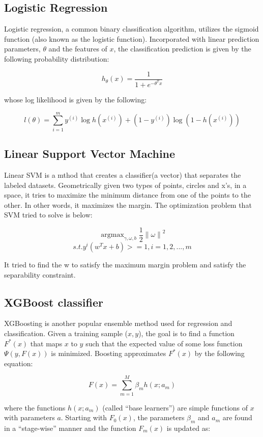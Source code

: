\documentclass[10pt]{article}
\DeclareMathOperator*{\argmax}{argmax}
\begin{document}
\subsection{Logistic Regression}
Logistic regression, a common binary classification algorithm, utilizes the sigmoid function (also known as the logistic function). Incorporated with linear prediction parameters, $\theta$ and the features of $x$, the classification prediction
is given by the following probability distribution:

\[h_{\theta}(x)=\frac{1}{1+e^{-{\theta}^{T}x}}\]

whose log likelihood is given by the following:

\[l(\theta)= \sum_{i=1}^{m}y^{(i)}\log h(x^{(i)})+(1-y^{(i)})\log (1-h(x^{(i)}))\]

\subsection{Linear Support Vector Machine}

Linear SVM is a mthod that creates a classifier(a vector)
that separates the labeled datasets. Geometrically given two
types of points, circles and x’s, in a space, it tries to maximize the minimum distance from one of the points to the other. In other words, it maximizes the margin. The optimization problem that SVM tried to solve is below:


\[\argmax_{\gamma,\omega,b}\frac{1}{2}\left\|\omega\right\|^2\]
\[s.t. y^{i}(w^{T}x+b)>=1,i=1,2,...,m\]

It tried to find the w to satisfy the maximum margin problem and satisfy the separability constraint.

\subsection{XGBoost classifier}

XGBoosting is another popular ensemble
method used for regression and classification. Given a training
sample ($x, y$), the goal is to find a function $F^{*}(x)$ that maps $x$ to
$y$ such that the expected value of some loss function $\Psi(y, F(x))$
is minimized. Boosting approximates $F^{*}(x)$ by the following
equation:

\[F(x) = \sum_{m=1}^{M}\beta_mh(x;a_m)\]

where the functions $h(x; a_m)$ (called “base learners”) are simple
functions of $x$ with parameters $a$. Starting with $F_0(x)$, the
parameters $\beta_m$ and $a_m$ are found in a “stage-wise” manner and
the function $F_m(x)$ is updated as:
\end{document}
